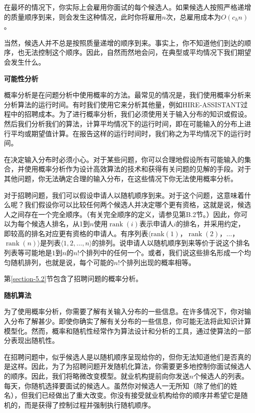 \documentclass[lang=cn,newtx,10pt,scheme=chinese]{elegantbook}
\begin{document}
在最坏的情况下，你实际上会雇用你面试的每个候选人。如果候选人按照严格递增的质量顺序到来，则会发生这种情况，此时你将雇用$n$次，总雇用成本为$O\left(c_h n\right)$。

当然，候选人并不总是按照质量递增的顺序到来。事实上，你不知道他们到达的顺序，也无法控制这个顺序。因此，自然而然地会问，在典型或平均情况下我们期望会发生什么。

\textbf{可能性分析}

概率分析是在问题分析中使用概率的方法。最常见的情况是，我们使用概率分析来分析算法的运行时间。有时我们使用它来分析其他量，例如HIRE-ASSISTANT过程中的招聘成本。为了进行概率分析，我们必须使用关于输入分布的知识或假设。然后我们分析我们的算法，计算平均情况下的运行时间，即在可能输入的分布上进行平均或期望值计算。在报告这样的运行时间时，我们称之为平均情况下的运行时间。

在决定输入分布时必须小心。对于某些问题，你可以合理地假设所有可能输入的集合，并使用概率分析作为设计高效算法的技术和获得有关问题的见解的手段。对于其他问题，你无法确定合理的输入分布，在这些情况下你无法使用概率分析。

对于招聘问题，我们可以假设申请人以随机顺序到来。对于这个问题，这意味着什么呢？我们假设你可以比较任何两个候选人并决定哪个更有资格，这就是说，候选人之间存在一个完全顺序。（有关完全顺序的定义，请参见第B.2节。）因此，你可以为每个候选人排名，从1到$n$使用$\operatorname{rank}(i)$表示申请人$i$的排名，并采用约定，即较高的排名对应更有资格的申请人。有序列表$\langle\operatorname{rank(1)}$，$\operatorname{rank}(2)$，$\ldots$，$\operatorname{rank}(n)\rangle$是列表$\langle 1,2,\ldots,n\rangle$的排列。说申请人以随机顺序到来等价于说这个排名列表等可能地是$1$到$n$的$n$!个排列中的任何一个。或者，我们说这些排名形成一个均匀随机排列，也就是说，每个可能的$n$!个排列出现的概率相等。

第\ref{section-5.2}节包含了招聘问题的概率分析。

\textbf{随机算法}

为了使用概率分析，你需要了解有关输入分布的一些信息。在许多情况下，你对输入分布了解甚少。即使你确实了解有关分布的一些信息，你可能无法将此知识计算模型化。然而，概率和随机性经常作为算法设计和分析的工具，通过使算法的一部分表现出随机性。

在招聘问题中，似乎候选人是以随机顺序呈现给你的，但你无法知道他们是否真的是这样。因此，为了为招聘问题开发随机化算法，你需要更多地控制你面试候选人的顺序。因此，我们将略微改变模型。就业机构提前向你发送$n$个候选人的列表。每天，你随机选择要面试的候选人。虽然你对候选人一无所知（除了他们的姓名），但我们已经做出了重大改变。你没有接受就业机构给你的顺序并希望它是随机的，而是获得了控制过程并强制执行随机顺序。
\end{document}
